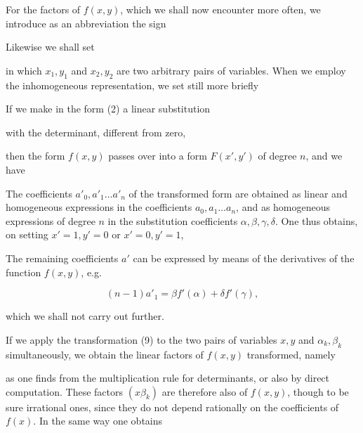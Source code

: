 
For the factors of $f(x, y)$, which we shall now encounter more often, we introduce as an abbreviation the sign


Likewise we shall set


in which $x_1, y_1$ and $x_2, y_2$ are two arbitrary pairs of variables. When we employ the inhomogeneous representation, we set still more briefly


If we make in the form (2) a linear substitution


with the determinant, different from zero,


then the form $f(x, y)$ passes over into a form $F(x', y')$ of degree $n$, and we have


The coefficients $a'_0, a'_1 \ldots a'_n$ of the transformed form are obtained as linear and homogeneous expressions in the coefficients $a_0, a_1 \ldots a_n$, and as homogeneous expressions of degree $n$ in the substitution coefficients $\alpha, \beta, \gamma, \delta$. One thus obtains, on setting $x' = 1, y' = 0$ or $x' = 0, y' = 1$,


The remaining coefficients $a'$ can be expressed by means of the derivatives of the function $f(x, y)$, e.g.

\[
(n - 1) a'_1 = \beta f'(\alpha) + \delta f'(\gamma),
\]

which we shall not carry out further.

If we apply the transformation (9) to the two pairs of variables $x, y$ and $\alpha_k, \beta_k$ simultaneously, we obtain the linear factors of $f(x, y)$ transformed, namely


as one finds from the multiplication rule for determinants, or also by direct computation. These factors $(x\beta_k)$ are therefore also  of $f(x, y)$, though to be sure irrational ones, since they do not depend rationally on the coefficients of $f(x)$. In the same way one obtains
